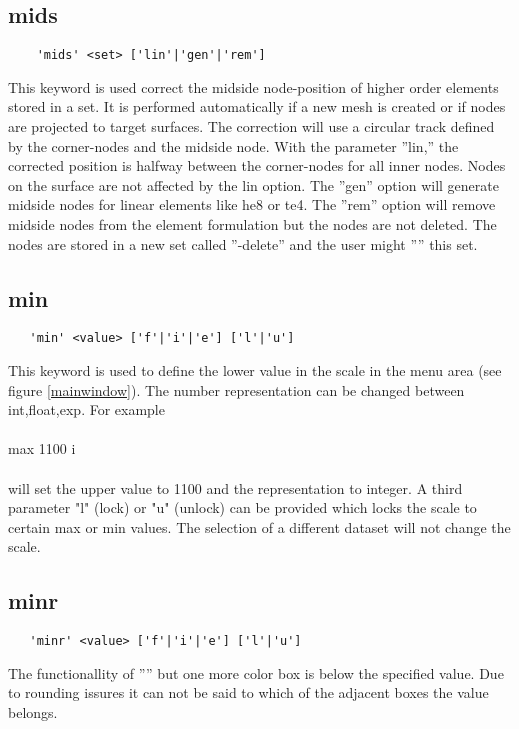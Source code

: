 \documentclass{article}
\begin{document}
\subsection{\label{mids}mids}
\begin{verbatim}
    'mids' <set> ['lin'|'gen'|'rem']
\end{verbatim}
This keyword is used correct the midside node-position of higher order elements stored in a set. It is performed automatically if a new mesh is created or if nodes are projected to target surfaces. The correction will use a circular track defined by the corner-nodes and the midside node. With the parameter ''lin,'' the corrected position is halfway between the corner-nodes for all inner nodes. Nodes on the surface are not affected by the lin option. The ''gen'' option will generate midside nodes for linear elements like he8 or te4. The ''rem'' option will remove midside nodes from the element formulation but the nodes are not deleted. The nodes are stored in a new set called ''-delete'' and the user might '''' this set. 

\subsection{\label{min}min}
\begin{verbatim}
   'min' <value> ['f'|'i'|'e'] ['l'|'u']
\end{verbatim}
This keyword is used to define the lower value in the scale in the menu area (see figure \ref{mainwindow}). The number representation can be changed between int,float,exp. For example\\\\max 1100 i\\\\will set the upper value to 1100 and the representation to integer. A third parameter "l" (lock) or "u" (unlock) can be provided which locks the scale to certain max or min values. The selection of a different dataset will not change the scale.

\subsection{\label{minr}minr}
\begin{verbatim}
   'minr' <value> ['f'|'i'|'e'] ['l'|'u']
\end{verbatim}
The functionallity of '''' but one more color box is below the specified value. Due to rounding issures it can not be said to which of the adjacent boxes the value belongs. 
\end{document}
